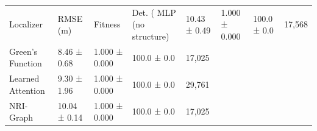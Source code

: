 \begin{tabular}{lllll}
\toprule
Localizer & RMSE (m) & Fitness & Det. (%
\midrule
MLP (no structure) & 10.43 ± 0.49 & 1.000 ± 0.000 & 100.0 ± 0.0 & 17,568 \\
Green's Function & 8.46 ± 0.68 & 1.000 ± 0.000 & 100.0 ± 0.0 & 17,025 \\
Learned Attention & 9.30 ± 1.96 & 1.000 ± 0.000 & 100.0 ± 0.0 & 29,761 \\
NRI-Graph & 10.04 ± 0.14 & 1.000 ± 0.000 & 100.0 ± 0.0 & 17,025 \\
\bottomrule
\end{tabular}
